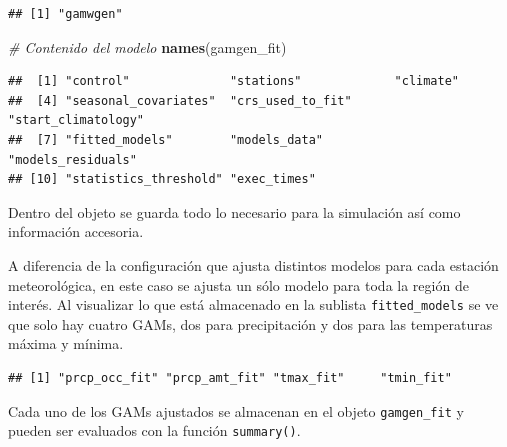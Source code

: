 \documentclass[
  12pt]{article}
\newenvironment{Shaded}{}{}
\newcommand{\CommentTok}[1]{\textcolor[rgb]{0.38,0.63,0.69}{\textit{#1}}}
\newcommand{\KeywordTok}[1]{\textcolor[rgb]{0.00,0.44,0.13}{\textbf{#1}}}
\newcommand{\NormalTok}[1]{#1}
\newcommand{\OperatorTok}[1]{\textcolor[rgb]{0.40,0.40,0.40}{#1}}
\begin{document}
\begin{verbatim}
## [1] "gamwgen"
\end{verbatim}

\begin{Shaded}
\begin{Highlighting}[]
\CommentTok{# Contenido del modelo }
\KeywordTok{names}\NormalTok{(gamgen_fit)}
\end{Highlighting}
\end{Shaded}

\begin{verbatim}
##  [1] "control"              "stations"             "climate"             
##  [4] "seasonal_covariates"  "crs_used_to_fit"      "start_climatology"   
##  [7] "fitted_models"        "models_data"          "models_residuals"    
## [10] "statistics_threshold" "exec_times"
\end{verbatim}

Dentro del objeto se guarda todo lo necesario para la simulación así como información accesoria.

A diferencia de la configuración que ajusta distintos modelos para cada estación meteorológica, en este caso se ajusta un sólo modelo para toda la región de interés. Al visualizar lo que está almacenado en la sublista \texttt{fitted\_models} se ve que solo hay cuatro GAMs, dos para precipitación y dos para las temperaturas máxima y mínima.

\begin{Shaded}
\end{Shaded}

\begin{verbatim}
## [1] "prcp_occ_fit" "prcp_amt_fit" "tmax_fit"     "tmin_fit"
\end{verbatim}

Cada uno de los GAMs ajustados se almacenan en el objeto \texttt{gamgen\_fit} y pueden ser evaluados con la función \texttt{summary()}.

\begin{Shaded}
\end{Shaded}
\end{document}
